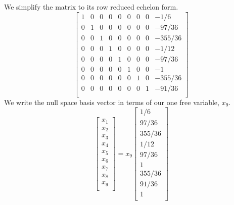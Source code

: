 \documentclass{article}
\begin{document}
	We simplify the matrix to its row reduced echelon form.
	$$
	\begin{bmatrix}
	1   &       0     &     0   &       0  &        0    &      0   &       0    &      0  &     -1/6\\
	0   &       1     &     0   &       0  &        0    &      0   &       0    &      0  &   -97/36\\
	0   &       0     &     1   &       0  &        0    &      0   &       0    &      0  &  -355/36\\
	0   &       0     &     0   &       1  &        0    &      0   &       0    &      0  &    -1/12\\
	0   &       0     &     0   &       0  &        1    &      0   &       0    &      0  &   -97/36\\
	0   &       0     &     0   &       0  &        0    &      1   &       0    &      0  &       -1\\
	0   &       0     &     0   &       0  &        0    &      0   &       1    &      0  &  -355/36\\
	0   &       0     &     0   &       0  &        0    &      0   &       0    &      1  &   -91/36\\
	\end{bmatrix}
	$$
	We write the null space basis vector in terms of our one free variable, $x_9$.
	\begin{equation*}
	\begin{bmatrix}
	x_1 \\
	x_2 \\
	x_3 \\
	x_4 \\
	x_5 \\
	x_6 \\
	x_7 \\
	x_8 \\
	x_9 \\
	\end{bmatrix}
	= 
	x_9
	\begin{bmatrix}
	1/6 \\
	97/36 \\
	355/36 \\
	1/12\\
	97/36\\
	1\\
	355/36\\
	91/36\\
	1 \\
	\end{bmatrix}
	\end{equation*}
\end{document}
